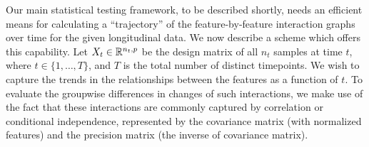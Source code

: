 Our main statistical testing framework, to be described shortly, needs an efficient means for calculating a ``trajectory'' of the feature-by-feature interaction graphs over time
for the given longitudinal data. We now describe a scheme which offers this capability. 
Let $X_t \in \mathbb{R}^{n_t,p}$ be the design matrix of all $n_t$ samples at time $t$, where $t \in \{1,\ldots,T\}$, and $T$ is the total number of distinct timepoints.
We wish to capture the trends in the relationships between the features as a function of $t$. 
To evaluate the groupwise differences in changes of such interactions, we make use of the fact
that these interactions are commonly captured by correlation or conditional independence, represented by the covariance matrix (with normalized features)
and the precision matrix (the inverse of covariance matrix).

